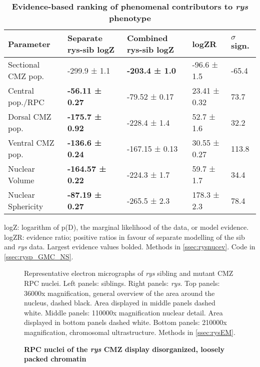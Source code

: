 \begin{table}[!ht]
    \centering
    \caption{{\bf Evidence-based ranking of phenomenal contributors to \textit{rys} phenotype}}
    \begin{tabular}{|l|l|l|l|l|} 
        \hline {\bf Parameter} & {\bf Separate rys-sib logZ} & {\bf Combined rys-sib logZ} & {\bf logZR} & {\bf $\sigma$ sign.}\\ \hline 
        Sectional CMZ pop. & -299.9 ± 1.1 & {\bf -203.4 ± 1.0} & -96.6 ± 1.5 & -65.4 \\ \hline
        Central pop./RPC  & {\bf -56.11 ± 0.27} & -79.52 ± 0.17 & 23.41 ± 0.32 & 73.7 \\ \hline 
        Dorsal CMZ pop. & {\bf -175.7 ± 0.92} & -228.4 ± 1.4 & 52.7 ± 1.6 & 32.2 \\ \hline 
        Ventral CMZ pop. & {\bf -136.6 ± 0.24} & -167.15 ± 0.13 & 30.55 ± 0.27 & 113.8 \\ \hline 
        Nuclear Volume & {\bf -164.57 ± 0.22} & -224.3 ± 1.7 & 59.7 ± 1.7 & 34.4 \\ \hline 
        Nuclear Sphericity & {\bf -87.19 ± 0.27} & -265.5 ± 2.3 & 178.3 ± 2.3 & 78.4 \\ \hline
    \end{tabular}
    \begin{flushleft}
    logZ: logarithm of p(D), the marginal likelihood of the data, or model evidence. logZR: evidence ratio; positive ratios in favour of separate modelling of the sib and \textit{rys} 
    data. Largest evidence values bolded.
    Methods in \autoref{ssec:rysnucev}.
    Code in \autoref{ssec:rysp_GMC_NS}.
    \end{flushleft}
    \label{nuclearev}
\end{table}

\FloatBarrier

\begin{figure}[!h]
    \caption{{\bf RPC nuclei of the \textit{rys} CMZ display disorganized, loosely packed chromatin}}
    Representative electron micrographs of \textit{rys} sibling and mutant CMZ RPC nuclei.
    Left panels: siblings. Right panels: \textit{rys}. Top panels: 36000x magnification, general overview of the area around the nucleus, dashed black. Area displayed in middle panels dashed white. Middle panels: 110000x magnification nuclear detail. Area displayed in bottom panels dashed white. Bottom panels: 210000x magnification, chromosomal ultrastructure.
    Methods in \autoref{ssec:rysEM}.
    \label{rysEM}
\end{figure}

